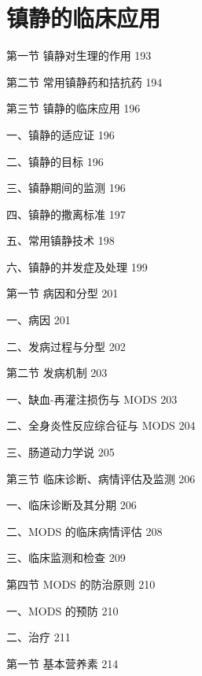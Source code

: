 \documentclass[10pt]{article}
\begin{document}
\section*{镇静的临床应用}
第一节 镇静对生理的作用 193

第二节 常用镇静药和拮抗药 194

第三节 镇静的临床应用 196

一、镇静的适应证 196

二、镇静的目标 196

三、镇静期间的监测 196

四、镇静的撒离标准 197

五、常用镇静技术 198

六、镇静的并发症及处理 199

第一节 病因和分型 201

一、病因 201

二、发病过程与分型 202

第二节 发病机制 203

一、缺血-再灌注损伤与 MODS 203

二、全身炎性反应综合征与 MODS 204

三、肠道动力学说 205

第三节 临床诊断、病情评估及监测 206

一、临床诊断及其分期 206

二、MODS 的临床病情评估 208

三、临床监测和检查 209

第四节 MODS 的防治原则 210

一、MODS 的预防 210

二、治疗 211

第一节 基本营养素 214
\end{document}
